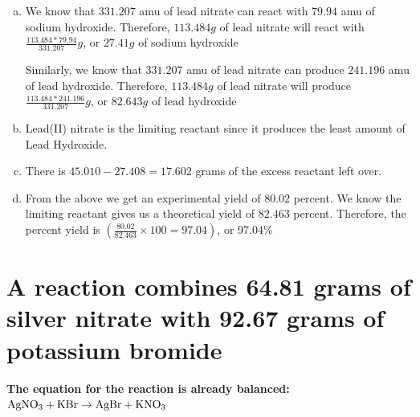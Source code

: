 \documentclass{scrartcl}
\begin{document}
\begin{enumerate}[a.]
\item We know that \(331.207\) amu of  lead nitrate can react with \(79.94\) amu of sodium
hydroxide. Therefore, \(113.484g\) of lead nitrate will react with
\(\frac{113.484*79.94}{331.207}g\), or \(27.41g\) of sodium hydroxide

Similarly, we know that \(331.207\) amu of  lead nitrate can produce \(241.196\) amu of lead
hydroxide. Therefore, \(113.484g\) of lead nitrate will produce
\(\frac{113.484*241.196}{331.207}g\), or \(82.643g\) of lead hydroxide
\item Lead(II) nitrate is the limiting reactant since it produces the least amount
of Lead Hydroxide.
\item There is \(45.010-27.408=17.602\) grams of the excess reactant left over.
\item From the above we get an experimental yield of \(80.02\) percent. We know the
limiting reactant gives us a theoretical yield of \(82.463\) percent.
Therefore, the percent yield is    \((\frac{80.02}{82.463}\times100=97.04)\), or 97.04\%
\end{enumerate}

\section{A reaction combines 64.81 grams of silver nitrate with 92.67 grams of potassium bromide}
\label{sec:orgc1ae34f}
\textbf{The equation for the reaction is already balanced:}
\(\ce{AgNO3}+\ce{KBr}\rightarrow\ce{AgBr}+\ce{KNO3}\)
\end{document}
